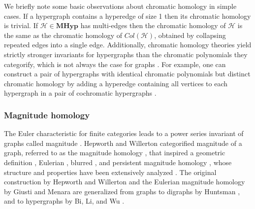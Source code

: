 \documentclass{amsart}
\newcommand{\MHyp}{\mathrm{\textbf{MHyp}}}
\newcommand{\betti}[2]{\beta_{#2}^{#1}}
\renewcommand{\H}{\mathcal{H}}
\begin{document}
We briefly note some basic observations about chromatic homology in simple cases. If a hypergraph contains a hyperedge of size 1 then its chromatic homology is trivial. 
If $\H \in \MHyp$ has multi-edges then the chromatic homology of $\H$ is the same as the chromatic homology of $Col(\H)$, obtained by collapsing repeated edges into a single edge.
Additionally, chromatic homology theories yield strictly stronger invariants for hypergraphs than the chromatic polynomials they categorify, which is not always the case for graphs \cite{lowrance2017chromatic}. For example, one can construct a pair of hypergraphs with identical chromatic polynomials but distinct chromatic homology by adding a hyperedge containing all vertices to each hypergraph in a pair of cochromatic hypergraphs \cite{aslam2023categorifying}. 


\subsubsection{Magnitude homology}
The Euler characteristic for finite categories \cite{Leinster2008EulerChar} leads to a power series invariant of graphs called magnitude \cite{leinster_2019}.  Hepworth and Willerton categorified magnitude of a graph, referred to as the magnitude homology \cite{hepworth2017categorifying}, that inspired a geometric definition \cite{asao2021geometric}, Eulerian \cite{giusti2024eulerian}, blurred \cite{otter2022magnitude}, and persistent magnitude homology \cite{govc2021persistent}, whose structure and properties have been extensively analyzed \cite{asao2024girth, gu2018graph, kaneta2021magnitude, sazdanovic2021torsion, martin2025torsion}. The original construction by Hepworth and Willerton and the Eulerian magnitude homology by Giusti and Menara are generalized from graphs to digraphs by Huntsman \cite{huntsman2022magnitude, huntsman2023magnitude}, and to hypergraphs by Bi, Li, and Wu
\cite{bi2024magnitude}. 
\end{document}
